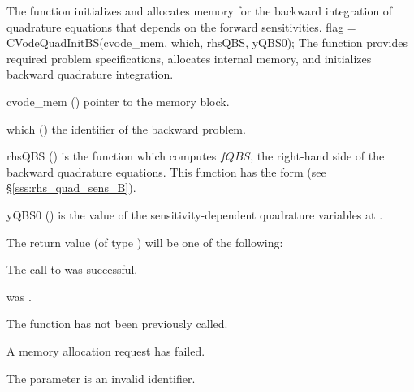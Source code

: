 The function  initializes and allocates memory for the backward
integration of quadrature equations that depends on the forward sensitivities.
{
flag = CVodeQuadInitBS(cvode\_mem, which, rhsQBS, yQBS0);
}
{
  The function  provides required problem specifications,
  allocates internal memory, and initializes backward quadrature integration.
}
{
  \begin{args}
  \item[cvode\_mem] ()
    pointer to the {\cvodes} memory block.
  \item[which] ()
    the identifier of the backward problem.
  \item[rhsQBS] ()
    is the {\C} function which computes $fQBS$, the right-hand side of the 
    backward quadrature equations. This function has the form 
    (see \S\ref{sss:rhs_quad_sens_B}).
  \item[yQBS0] ()
    is the value of the sensitivity-dependent quadrature variables at .
  \end{args}
}
{
  The return value  (of type ) will be one of the following:
  \begin{args}
  \item[\Id{CV\_SUCCESS}]
    The call to  was successful.
  \item[\Id{CV\_MEM\_NULL}] 
     was .
  \item[\Id{CV\_NO\_ADJ}]
    The function  has not been previously called.
  \item[\Id{CV\_MEM\_FAIL}] 
    A memory allocation request has failed.
  \item[\Id{CV\_ILL\_INPUT}]
    The parameter  is an invalid identifier.
  \end{args}
}
{}


